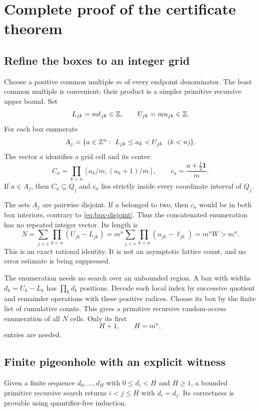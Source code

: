 \section{Complete proof of the certificate theorem}\label{sec:proof}

\subsection{Refine the boxes to an integer grid}

Choose a positive common multiple \(m\) of every endpoint denominator.
The least common multiple is convenient; their product is a simpler
primitive recursive upper bound. Set
\[
 L_{jk}=m\ell_{jk}\in\mathbb Z,\qquad U_{jk}=mu_{jk}\in\mathbb Z.
\]
For each box enumerate
\[
 A_j=\{a\in\Z^n:\ L_{jk}\leq a_k<U_{jk}\ \ (k<n)\}.
\]
The vector \(a\) identifies a grid cell and its center:
\[
 C_a=\prod_{k<n}[a_k/m,(a_k+1)/m],
 \qquad c_a=\frac{a+\tfrac12\mathbf1}{m}.
\]
If \(a\in A_j\), then \(C_a\subseteq Q_j\) and \(c_a\) lies
strictly inside every coordinate interval of \(Q_j\).

The sets \(A_j\) are pairwise disjoint. If \(a\) belonged to two,
then \(c_a\) would be in both box interiors, contrary to
\cref{eq:box-disjoint}. Thus the concatenated enumeration has no
repeated integer vector. Its length is
\begin{equation}\label{eq:cell-count}
 N=\sum_{j<s}\prod_{k<n}(U_{jk}-L_{jk})
   =m^n\sum_{j<s}\prod_{k<n}(u_{jk}-\ell_{jk})
   =m^nW>m^n.
\end{equation}
This is an exact rational identity. It is not an asymptotic lattice
count, and no error estimate is being suppressed.

The enumeration needs no search over an unbounded region. A box
with widths \(d_k=U_k-L_k\) has \(\prod_kd_k\) positions.
Decode each local index by successive quotient and remainder
operations with these positive radices. Choose its box by the
finite list of cumulative counts. This gives a primitive recursive
random-access enumeration of all \(N\) cells. Only its first
\[
                    H+1,\qquad H=m^n,
\]
entries are needed.

\subsection{Finite pigeonhole with an explicit witness}

\begin{lemma}\label{lem:php}
Given a finite sequence \(d_0,\ldots,d_H\) with \(0\leq d_i<H\)
and \(H\geq1\), a bounded primitive recursive search returns
\(i<j\leq H\) with \(d_i=d_j\). Its correctness is provable using
quantifier-free induction.
\end{lemma}

